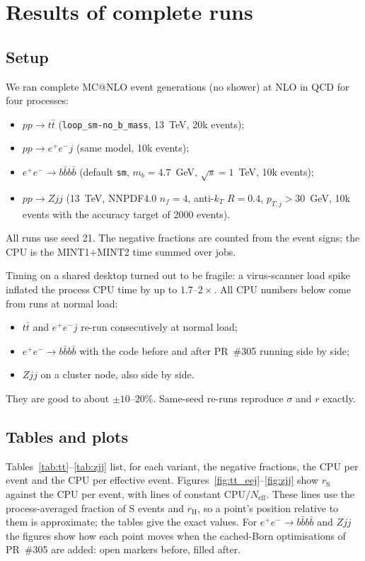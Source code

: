\documentclass[11pt,a4paper]{article}
\makeatletter
\newcommand{\mcatnlo}{\textsc{MC@NLO}}
\newcommand{\rS}{r_{\mathrm S}}
\newcommand{\rH}{r_{\mathrm H}}
\newcommand{\Neff}{N_{\mathrm{eff}}}
\newcommand{\code}[1]{\texttt{#1}}
\makeatother
\begin{document}
\section{Results of complete runs}
\label{sec:runs}

\subsection{Setup}
We ran complete \mcatnlo{} event generations (no shower) at NLO in QCD for four processes:
\begin{itemize}
\item $pp\to t\bar t$ (\code{loop\_sm-no\_b\_mass}, 13~TeV, 20k events);
\item $pp\to e^+e^-j$ (same model, 10k events);
\item $e^+e^-\to b\bar b b\bar b$ (default \code{sm}, $m_b=4.7$~GeV, $\sqrt s=1$~TeV, 10k events);
\item $pp\to Zjj$ (13~TeV, NNPDF4.0 $n_f=4$, anti-$k_T$ $R=0.4$, $p_{T,j}>30$~GeV, 10k events
with the accuracy target of 2000 events).
\end{itemize}
All runs use seed 21. The negative fractions are counted from the event signs; the CPU is
the MINT1+MINT2 time summed over jobs.

Timing on a shared desktop turned out to be fragile: a virus-scanner load spike inflated the
process CPU time by up to $1.7$--$2\times$. All CPU numbers below come from runs at normal load:
\begin{itemize}
\item $t\bar t$ and $e^+e^-j$ re-run consecutively at normal load;
\item $e^+e^-\to b\bar b b\bar b$ with the code before and after PR~\#305 running side by side;
\item $Zjj$ on a cluster node, also side by side.
\end{itemize}
They are good to about $\pm10$--$20\%$. Same-seed re-runs reproduce $\sigma$ and $r$ exactly.

\subsection{Tables and plots}
Tables~\ref{tab:tt}--\ref{tab:zjj} list, for each variant, the negative fractions, the CPU
per event and the CPU per effective event. Figures~\ref{fig:tt_eej}--\ref{fig:zjj} show
$\rS$ against the CPU per event, with lines of constant CPU$/\Neff$. These lines use the
process-averaged fraction of S events and $\rH$, so a point's position relative to them is
approximate; the tables give the exact values. For $e^+e^-\to b\bar b b\bar b$ and $Zjj$
the figures show how each point moves when the cached-Born optimisations of PR~\#305 are
added: open markers before, filled after.
\end{document}
